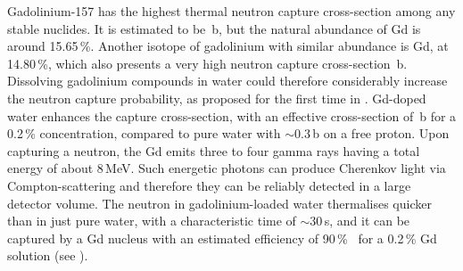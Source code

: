 Gadolinium-157 has the highest thermal neutron capture cross-section among any stable nuclides.
It is estimated to be \,b, but the natural abundance of Gd is around 15.65\,\%.
Another isotope of gadolinium with similar abundance is Gd, at 14.80\,\%, %
which also presents a very high neutron capture cross-section \,b.
Dissolving gadolinium compounds in water could therefore considerably increase the neutron capture %
probability, as proposed for the first time in .
Gd-doped water enhances the capture cross-section, with an effective cross-section of \,b for a 0.2\,\% concentration, %
compared to pure water with $\sim$0.3\,b on a free proton.
Upon capturing a neutron, the Gd emits three to four gamma rays having a total energy of about 8\,MeV.
Such energetic photons can produce Cherenkov light via Compton-scattering and therefore they can be 
reliably detected in a large detector volume.
The neutron in gadolinium-loaded water thermalises quicker than in just pure water, with a %
characteristic time of $\sim$30\,\textmu s, and it can be captured by a Gd nucleus with an %
estimated efficiency of 90\,\%~\cite{Beacom:2003nk} for a 0.2\,\% Gd solution (see ).

